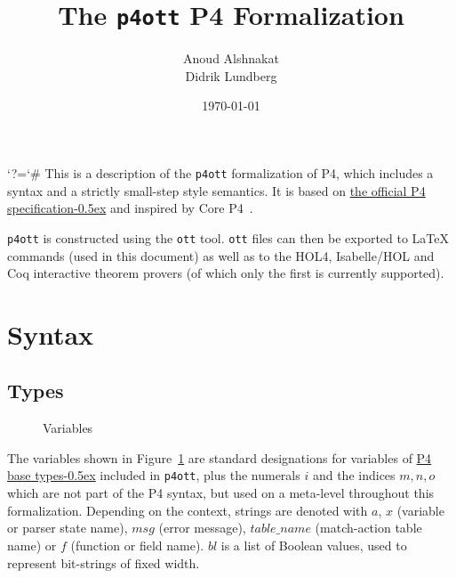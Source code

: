 \documentclass[UTF8]{article}
\title{%
The \texttt{p4ott} P4 Formalization}
\author{Anoud Alshnakat\\
Didrik Lundberg
}
\date{\today}
\begin{document}
\maketitle

\newcommand{\pfott}{\texttt{p4ott}}

\begingroup\lccode`?=`# \lowercase{\endgroup
\newcommand{\specsec}[1]{%
    ?#1%
}
}
\newcommand{\pfourspec}[2]{%
\href{https://p4lang.github.io/p4-spec/docs/P4-16-v1.2.2.html\specsec{#1}}{#2\kern-0.5ex} %
}
\noindent
This is a description of the \pfott{} formalization of P4, which includes a syntax and a strictly small-step style semantics. It is based on \pfourspec{}{the official P4 specification} and inspired by Core P4~\cite{doenges2021petr4}.

\pfott{} is constructed using the \texttt{ott} tool. \texttt{ott} files can then be exported to \LaTeX{} commands (used in this document) as well as to the HOL4, Isabelle/HOL and Coq interactive theorem provers (of which only the first is currently supported).

\section{Syntax}
\subsection{Types}
\newcommand{\num}{\ensuremath{i}}
\newcommand{\vn}{\ensuremath{x}}
\newcommand{\vna}{\ensuremath{a}}
\newcommand{\msg}{\ensuremath{\mathit{msg}}}
\newcommand{\tn}{\ensuremath{\mathit{table\_name}}}
\newcommand{\fn}{\ensuremath{f}}
\newcommand{\inte}{\ensuremath{bl}}
%
%
\begin{figure}[h!]
\centering
\ottmetavars
\caption{Variables}
\label{fig:vars}
\end{figure}

The variables shown in Figure~\ref{fig:vars} are standard designations for variables of \pfourspec{sec-base-types}{P4 base types} included in \pfott{}, plus the numerals \num{} and the indices $m, n, o$ which are not part of the P4 syntax, but used on a meta-level throughout this formalization. Depending on the context, strings are denoted with \vna{}, \vn{} (variable or parser state name), \msg{} (error message), \tn{} (match-action table name) or \fn{} (function or field name). \inte{} is a list of Boolean values, used to represent bit-strings of fixed width.
\end{document}
